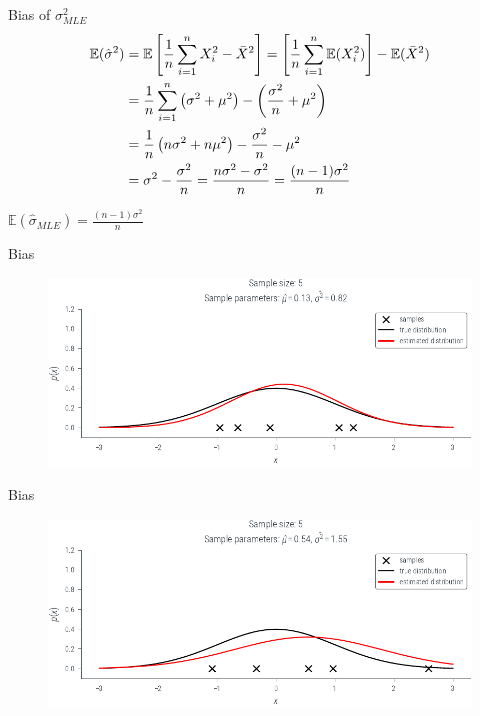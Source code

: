 \documentclass[handout]{beamer}
\begin{document}
    \begin{frame}{Bias of $\sigma^2_{MLE}$}
        \begin{align*}
            \mathbb{E}(\hat{\sigma}^2) &=\mathbb{E}\left[\frac{1}{n}\sum_{i=1}^nX_i^2-\Bar{X}^2 \right] = \left[\frac{1}{n}\sum_{i=1}^n\mathbb{E}(X_i^2)\right]-\mathbb{E}(\Bar{X}^2)\\
            &=\frac{1}{n}\sum_{i=1}^n\left(\sigma^2+\mu^2\right) - \left(\frac{\sigma^2}{n}+\mu^2\right)\\
            &=\frac{1}{n}\left(n\sigma^2+n\mu^2\right) - \frac{\sigma^2}{n}-\mu^2\\
            &= \sigma^2 - \frac{\sigma^2}{n} = \frac{n\sigma^2-\sigma^2}{n} = \frac{(n-1)\sigma^2}{n}
        \end{align*}
        \begin{tcolorbox}[colback=metropolisblue!5,colframe=metropolisblue,title= Estimator $\hat{\sigma}_{MLE}$ is biased]
            $\mathbb{E}(\hat{\sigma}_{MLE}) = \frac{(n-1)\sigma^2}{n}$
        \end{tcolorbox}
    \end{frame}

        \begin{frame}{Bias }
            \begin{figure}
                \includegraphics{../figures/mle/biased-mle-normal-5-0.pdf}
            \end{figure}
            
        \end{frame}

             \begin{frame}{Bias }
            \begin{figure}
                \includegraphics{../figures/mle/biased-mle-normal-5-1.pdf}
            \end{figure}
            
        \end{frame}
\end{document}
